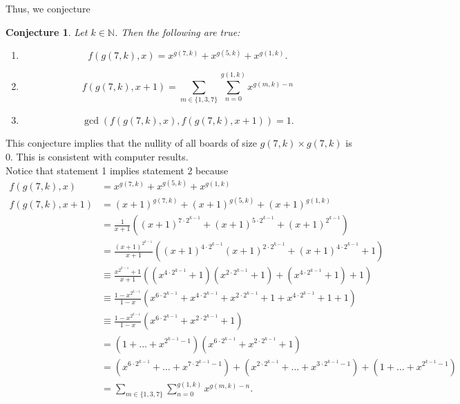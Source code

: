 \documentclass{article}
\newtheorem{conjecture}{Conjecture}
\newcommand{\N}{\mathbb{N}}
\begin{document}
	Thus, we conjecture
	\begin{conjecture}
		Let $k \in \N$.
		Then the following are true:
		\begin{enumerate}
			\item
			\begin{equation*}
				f(g(7,k),x) = x^{g(7,k)} + x^{g(5,k)} + x^{g(1,k)}.
			\end{equation*}
			\item
			\begin{equation*}
				f(g(7,k),x+1) = \sum_{m\in\{1,3,7\}}{\sum_{n=0}^{g(1,k)}{x^{g(m,k)-n}}}
			\end{equation*}
			\item
			\begin{equation*}
				\gcd\left(f(g(7,k),x),f(g(7,k),x+1)\right) = 1.
			\end{equation*}
		\end{enumerate}
	\end{conjecture}
	This conjecture implies that the nullity of all boards of size $g(7,k) \times g(7,k)$ is 0.
	This is consistent with computer results. \\
	
	Notice that statement 1 implies statement 2 because
	\begin{align*}
		f(g(7,k),x) &= x^{g(7,k)} + x^{g(5,k)} + x^{g(1,k)} \\
		f(g(7,k),x+1) &= (x+1)^{g(7,k)} + (x+1)^{g(5,k)} + (x+1)^{g(1,k)} \\
		&= \frac{1}{x+1} \left((x+1)^{7\cdot2^{k-1}} + (x+1)^{5\cdot2^{k-1}} + (x+1)^{2^{k-1}}\right) \\
		&= \frac{(x+1)^{2^{k-1}}}{x+1}\left((x+1)^{4\cdot2^{k-1}}(x+1)^{2\cdot2^{k-1}}+(x+1)^{4\cdot2^{k-1}}+1\right) \\
		&\equiv \frac{x^{2^{k-1}}+1}{x+1}\left(\left(x^{4\cdot2^{k-1}}+1\right)\left(x^{2\cdot2^{k-1}}+1\right)+\left(x^{4\cdot2^{k-1}}+1\right)+1\right) \\
		&\equiv \frac{1-x^{2^{k-1}}}{1-x}\left(x^{6\cdot2^{k-1}}+x^{4\cdot2^{k-1}}+x^{2\cdot2^{k-1}}+1+x^{4\cdot2^{k-1}}+1+1\right) \\
		&\equiv \frac{1-x^{2^{k-1}}}{1-x}\left(x^{6\cdot2^{k-1}}+x^{2\cdot2^{k-1}}+1\right) \\
		&= \left(1+\dots+x^{2^{k-1}-1}\right)\left(x^{6\cdot2^{k-1}}+x^{2\cdot2^{k-1}}+1\right) \\
		&= \left(x^{6\cdot2^{k-1}}+\dots+x^{7\cdot2^{k-1}-1}\right) + \left(x^{2\cdot2^{k-1}}+\dots+x^{3\cdot2^{k-1}-1}\right) + \left(1+\dots+x^{2^{k-1}-1}\right) \\
		&= \sum_{m\in\{1,3,7\}}{\sum_{n=0}^{g(1,k)}{x^{g(m,k)-n}}}.
	\end{align*}
	
\end{document}

